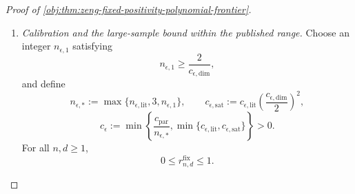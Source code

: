 \documentclass[11pt]{article}
\begin{document}
\begin{proof}[Proof of \cref{obj:thm:zeng-fixed-positivity-polynomial-frontier}]
\begin{enumerate}
Define the nearest-target test and its large-error events by
\[
\mathcal A_{\mathrm{test}}
:=
\left\{
\mathbf z:
|b_\kappa(\mathbf z)-\vartheta^{\mathrm{test}}_1|
\le
|b_\kappa(\mathbf z)-\vartheta^{\mathrm{test}}_0|
\right\},
\]
\[
\mathcal A_{\mathrm{bad},\iota}
:=
\left\{
\mathbf z:
|b_\kappa(\mathbf z)-\vartheta^{\mathrm{test}}_\iota|
\ge\frac{\delta_n}{2}
\right\},
\qquad \iota\in\{0,1\}.
\]
The triangle inequality gives
\[
\delta_n
=
|\vartheta^{\mathrm{test}}_1-\vartheta^{\mathrm{test}}_0|
\le
|b_\kappa-\vartheta^{\mathrm{test}}_0|
+
|b_\kappa-\vartheta^{\mathrm{test}}_1|.
\]
Consequently,
\[
\mathcal A_{\mathrm{test}}\subseteq\mathcal A_{\mathrm{bad},0},
\qquad
\mathcal A_{\mathrm{test}}^c\subseteq\mathcal A_{\mathrm{bad},1}.
\]
Applying the testing bound and then these inclusions yields
\[
c_{\mathrm{test}}
\le
Q^{\mathrm{test}}_1(\mathcal A_{\mathrm{bad},1})
+
Q^{\mathrm{test}}_0(\mathcal A_{\mathrm{bad},0}),
\]
and hence
\[
\frac{c_{\mathrm{test}}}{2}
\le
\max_{\iota\in\{0,1\}}
Q^{\mathrm{test}}_\iota(\mathcal A_{\mathrm{bad},\iota}).
\]
On each large-error event, squared loss is at least
\((\delta_n/2)^2\). Therefore
\[
\begin{split}
\frac{c_{\mathrm{test}}\delta_n^2}{8}
&\le
\left(\frac{\delta_n}{2}\right)^2
\max_{\iota\in\{0,1\}}
Q^{\mathrm{test}}_\iota(\mathcal A_{\mathrm{bad},\iota})\\
&\le
\max_{\iota\in\{0,1\}}
E_{Q^{\mathrm{test}}_\iota}
\left[
(b_\kappa-\vartheta^{\mathrm{test}}_\iota)^2
\right]\\
&\le
\max_{\iota\in\{0,1\}}
E_{P^{\mathrm{test}}_{Z,\iota}}
\left[
(\widehat\theta-\vartheta^{\mathrm{test}}_\iota)^2
\right].
\end{split}
\]
Both testing laws belong to the zero-control subclass, so taking the
minimax infimum gives
\[
\frac{c_{\mathrm{par}}}{n}
=
\frac{c_{\mathrm{test}}\delta_n^2}{8}
\le
\mathfrak R^{Z,0}_{n,d,\epsilon}
\le
\mathfrak R^Z_{n,d,\epsilon},
\qquad
c_{\mathrm{par}}:=\frac{c_{\mathrm{test}}}{128}>0.
\]

\item \textit{Calibration and the large-sample bound within the published range.}
Choose an integer \(n_{\epsilon,1}\) satisfying
\[
n_{\epsilon,1}\ge\frac2{c_{\epsilon,\mathrm{dim}}},
\]
and define
\[
n_{\epsilon,*}
:=
\max\{n_{\epsilon,\mathrm{lit}},3,n_{\epsilon,1}\},
\qquad
c_{\epsilon,\mathrm{sat}}
:=
c_{\epsilon,\mathrm{lit}}
\left(\frac{c_{\epsilon,\mathrm{dim}}}{2}\right)^2,
\]
\[
c_\epsilon
:=
\min\left\{
\frac{c_{\mathrm{par}}}{n_{\epsilon,*}},
\min\{c_{\epsilon,\mathrm{lit}},c_{\epsilon,\mathrm{sat}}\}
\right\}>0.
\]
For all \(n,d\ge1\),
\[
0\le r^{\mathrm{fix}}_{n,d}\le1.
\]


\end{enumerate}
\end{proof}
\end{document}
